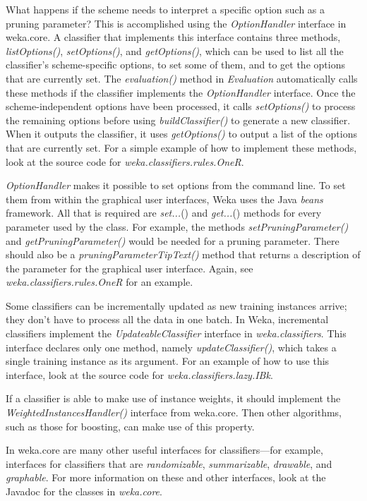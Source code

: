 What happens if the scheme needs to interpret a specific option such
as a pruning parameter? This is accomplished using
the \textit{OptionHandler} interface in weka.core. A classifier that
implements this interface contains three
methods, \textit{listOptions()}, \textit{setOptions()},
and \textit{getOptions()}, which can be used to list all the
classifier’s scheme-specific options, to set some of them, and to get
the options that are currently set. The \textit{evaluation()} method
in \textit{Evaluation} automatically calls these methods if the
classifier implements the \textit{OptionHandler} interface. Once the
scheme-independent options have been processed, it
calls \textit{setOptions()} to process the remaining options before
using \textit{buildClassifier()} to generate a new classifier. When it
outputs the classifier, it uses \textit{getOptions()} to output a list
of the options that are currently set. For a simple example of how to
implement these methods, look at the source code for
\textit{weka.classifiers.rules.OneR}.

\textit{OptionHandler} makes it possible to set options from the command
line. To set them from within the graphical user interfaces, Weka uses
the Java \textit{beans} framework. All that is required are \textit{set...}() and
\textit{get...}() methods for every parameter used by the class. For example,
the methods \textit{setPruningParameter()} and \textit{getPruningParameter()} would be
needed for a pruning parameter. There should also be a
\textit{pruningParameterTipText()} method that returns a description of the
parameter for the graphical user interface. Again, see
\textit{weka.classifiers.rules.OneR} for an example.

Some classifiers can be incrementally updated as new training
instances arrive; they don't have to process all the data in one
batch. In Weka, incremental classifiers implement the
\textit{UpdateableClassifier} interface in \textit{weka.classifiers}. This interface
declares only one method, namely \textit{updateClassifier()}, which
takes a single training instance as its argument. For an example of
how to use this interface, look at the source code
for \textit{weka.classifiers.lazy.IBk}.

If a classifier is able to make use of instance weights, it should
implement the \textit{WeightedInstancesHandler()} interface from
weka.core. Then other algorithms, such as those for boosting, can make
use of this property.

In weka.core are many other useful interfaces for classifiers---for
example, interfaces for classifiers that are \textit{randomizable},
\textit{summarizable}, \textit{drawable}, and \textit{graphable}. 
For more information on these
and other interfaces, look at the Javadoc for the classes in
\textit{weka.core}.


